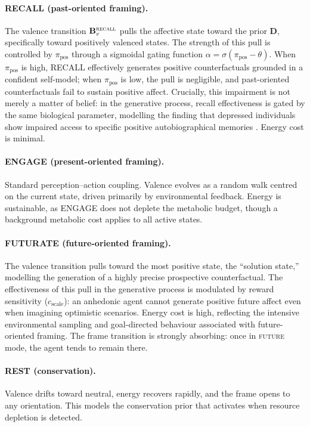\documentclass[11pt,a4paper]{article}
\begin{document}
\paragraph{RECALL (past-oriented framing).}
The valence transition $\mathbf{B}_v^{\textsc{recall}}$ pulls the affective state toward the prior $\mathbf{D}$, specifically toward positively valenced states. The strength of this pull is controlled by $\pi_{\text{pos}}$ through a sigmoidal gating function $\alpha = \sigma(\pi_{\text{pos}} - \theta)$. When $\pi_{\text{pos}}$ is high, RECALL effectively generates positive counterfactuals grounded in a confident self-model; when $\pi_{\text{pos}}$ is low, the pull is negligible, and past-oriented counterfactuals fail to sustain positive affect. Crucially, this impairment is not merely a matter of belief: in the generative process, recall effectiveness is gated by the same biological parameter, modelling the finding that depressed individuals show impaired access to specific positive autobiographical memories \citep{williams2007autobiographical}. Energy cost is minimal.

\paragraph{ENGAGE (present-oriented framing).}
Standard perception--action coupling. Valence evolves as a random walk centred on the current state, driven primarily by environmental feedback. Energy is sustainable, as ENGAGE does not deplete the metabolic budget, though a background metabolic cost applies to all active states.

\paragraph{FUTURATE (future-oriented framing).}
The valence transition pulls toward the most positive state, the ``solution state,'' modelling the generation of a highly precise prospective counterfactual. The effectiveness of this pull in the generative process is modulated by reward sensitivity ($c_{\text{scale}}$): an anhedonic agent cannot generate positive future affect even when imagining optimistic scenarios. Energy cost is high, reflecting the intensive environmental sampling and goal-directed behaviour associated with future-oriented framing. The frame transition is strongly absorbing: once in \textsc{future} mode, the agent tends to remain there.

\paragraph{REST (conservation).}
Valence drifts toward neutral, energy recovers rapidly, and the frame opens to any orientation. This models the conservation prior that activates when resource depletion is detected.
\end{document}
